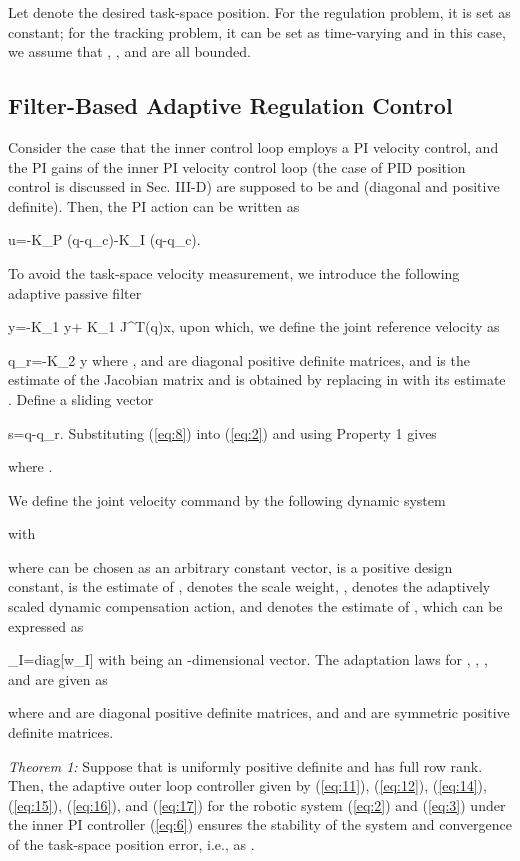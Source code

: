 \documentclass[9pt,technote]{IEEEtran}
\def \be {}
\begin{document}
Let  denote the desired task-space position. For the regulation problem, it is set as constant; for the tracking problem, it can be set as time-varying and in this case, we assume that , , and  are all bounded.

\subsection{Filter-Based Adaptive Regulation Control}

Consider the case that the inner control loop employs a PI velocity control, and the PI gains of the inner PI velocity control loop (the case of PID position control is discussed in Sec. III-D) are supposed to be  and  (diagonal and positive definite). Then, the PI action can be written as
\be
\label{eq:6}
u=-K_P (\dot q-\dot q_c)-K_I \left(q-q_c\right).
\ee

To avoid the task-space velocity measurement, we introduce the following adaptive passive filter
\be
\label{eq:7}
\dot y=-K_1 y+ K_1 \hat J^{T}(q)\Delta x,
\ee
upon which, we define the joint reference velocity as
\be
\label{eq:8}
\dot q_r=-K_2 y
\ee
where ,  and  are diagonal positive definite matrices, and  is the estimate of the Jacobian matrix  and is obtained by replacing  in  with its estimate .
Define a sliding vector
\be
\label{eq:9}
s=\dot q-\dot q_r.
\ee
 Substituting (\ref{eq:8}) into (\ref{eq:2}) and using Property 1 gives

where .



We define the joint velocity command by the following dynamic system
 
  with
  
 where  can be chosen as an arbitrary constant vector,  is a positive design constant,  is the estimate of ,   denotes the scale weight, ,  denotes the adaptively scaled dynamic compensation action, and  denotes the estimate of , which can be expressed as
\be
\label{eq:13}
_I={\rm diag}[\hat w_I]
\ee
with  being an -dimensional vector. The adaptation laws for , , , and  are given as

where  and  are diagonal positive definite matrices, and  and  are symmetric positive definite matrices.




\emph{Theorem 1:} Suppose that  is uniformly positive definite and  has full row rank. Then, the adaptive outer loop controller given by (\ref{eq:11}), (\ref{eq:12}), (\ref{eq:14}), (\ref{eq:15}), (\ref{eq:16}), and (\ref{eq:17}) for the robotic system (\ref{eq:2}) and (\ref{eq:3}) under the inner PI controller (\ref{eq:6}) ensures the stability of the system and convergence of the task-space position error, i.e.,  as .
\end{document}
